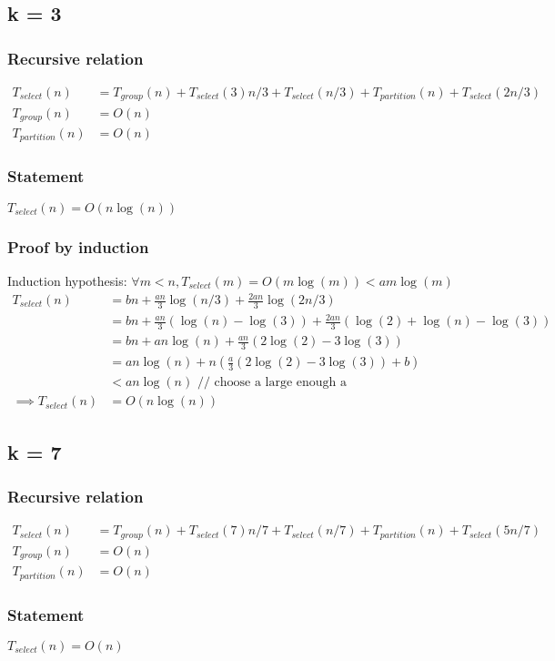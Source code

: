 \documentclass{article}
\begin{document}
\subsection{k = 3}
\subsubsection{Recursive relation}
\begin{align*}
T_{select}(n) &= T_{group}(n) + T_{select}(3)n/3 + T_{select}(n/3)
+T_{partition}(n) + T_{select}(2n/3)\\
T_{group}(n) &= O(n)\\
T_{partition}(n) &= O(n)
\end{align*}
\subsubsection{Statement}
$T_{select}(n) = O(n \log (n))$
\subsubsection{Proof by induction}
Induction hypothesis: $\forall m < n, T_{select}(m) = O(m\log(m)) < am\log(m)$
\begin{align*}
T_{select}(n)
&= bn + \frac{an}{3}\log(n/3) + \frac{2an}{3}\log(2n/3)\\
&= bn + \frac{an}{3}(\log(n) - \log(3)) + \frac{2an}{3}(\log(2)+\log(n)-\log(3))\\
&= bn + an \log(n) + \frac{an}{3}(2\log(2)-3\log(3))\\
&= an \log(n) + n(\frac{a}{3}(2\log(2)-3\log(3)) + b)\\
&< an \log(n) \text{ // choose a large enough a}\\
\implies T_{select}(n) &= O(n \log(n))
\end{align*}
\subsection{k = 7}
\subsubsection{Recursive relation}
\begin{align*}
T_{select}(n) &= T_{group}(n) + T_{select}(7)n/7 + T_{select}(n/7)
+T_{partition}(n) + T_{select}(5n/7)\\
T_{group}(n) &= O(n)\\
T_{partition}(n) &= O(n)
\end{align*}
\subsubsection{Statement}
$T_{select}(n) = O(n)$
\end{document}
